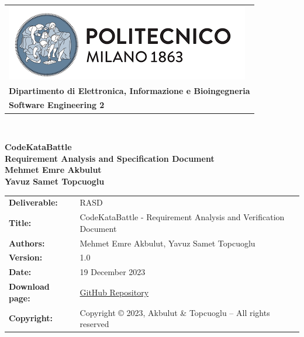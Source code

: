 \documentclass [11pt,twoside]{article}
\begin{document}

\begin{titlepage}



\begin{table}[t!]
\centering
\begin{tabu} to \textwidth { X[c] }
\includegraphics[scale=0.5]{Images/PolimiLogo} \\
\textbf{\small{Dipartimento di Elettronica, Informazione e Bioingegneria}} \\ 
\textbf{\small{Software Engineering 2}} \\
\end{tabu}
\end{table} ~
\\ [4cm]


\begin{center}
{\textbf{\Huge{CodeKataBattle}}} \\ 
\vspace{2mm}
{\textbf{\small{Requirement Analysis and Specification Document}}} \\ [4cm]
\textbf{\small{Mehmet Emre Akbulut}} \\
\vspace{1mm}
\textbf{\small{Yavuz Samet Topcuoglu}}
\end{center}





\end{titlepage}

\begin{table}[h!]
\begin{tabu} to \textwidth { X[0.3,r,p] X[0.7,l,p] }
\hline

\textbf{Deliverable:} & RASD\\
\textbf{Title:} & CodeKataBattle - Requirement Analysis and Verification Document \\
\textbf{Authors:} & Mehmet Emre Akbulut, Yavuz Samet Topcuoglu \\
\textbf{Version:} & 1.0 \\ 
\textbf{Date:} & 19 December 2023 \\
\textbf{Download page:} & \href{https://github.com/mehmetemreakbulut/AkbulutTopcuoglu}{GitHub Repository} \\
\textbf{Copyright:} & Copyright © 2023, Akbulut \& Topcuoglu – All rights reserved \\
\hline
\end{tabu}
\end{table}
\end{document}
